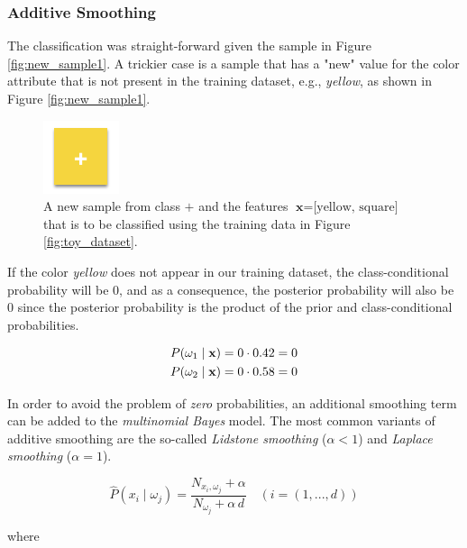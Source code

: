 \documentclass{article}
\begin{document}
\subsubsection{Additive Smoothing}
\label{sec:additive_smoothing}

The classification was straight-forward given the sample in Figure \ref{fig:new_sample1}. A trickier case is a sample that has a "new" value for the color attribute that is not present in the training dataset, e.g., \emph{yellow}, as shown in Figure \ref{fig:new_sample1}.

 \begin{figure}[h!]
\includegraphics[scale=0.5]{../images/toy_dataset_3.png}
\caption{A new sample from class $+$ and the features $\textbf{x} = \text{[yellow, square]}$ that is to be classified using the training data in Figure \ref{fig:toy_dataset}.}
\label{fig:new_sample2}
\end{figure}


If the color \emph{yellow} does not appear in our training dataset, the class-conditional probability will be 0, and as a consequence, the posterior probability will also be 0 since the posterior probability is the product of the prior and class-conditional probabilities.

\begin{equation} 
\begin{split}
& P(\omega_1 \mid \textbf x) = 0  \cdot  0.42 = 0 \\
& P(\omega_2 \mid \textbf x) = 0  \cdot  0.58 = 0 
\end{split}
\end{equation} 

In order to avoid the problem of \emph{zero} probabilities, an additional smoothing term can be added to the \emph{multinomial Bayes} model. The most common variants of additive smoothing are the so-called \emph{Lidstone smoothing} ($\alpha<1$) and  \emph{Laplace smoothing} ($\alpha=1$).


\begin{equation} \hat{P}(x_i \mid \omega_j) = \frac{N_{x_i, \omega_j}+\alpha}{N_{\omega_j} + \alpha \, d}  \quad (i = (1, ..., d))\end{equation}

where
\end{document}
